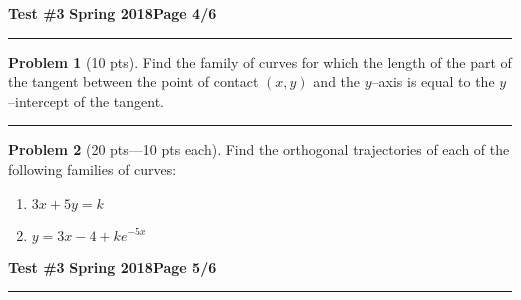 \documentclass[12pt]{article}
\theoremstyle{definition}
\newtheorem{problem}{Problem}
\begin{document}
\newpage

\hfill{\large\bf Test \#3}\hfill{\large\bf
  Spring 2018}\hfill{\large\bf Page 4/6}\hrule

\bigskip
\begin{problem}[10 pts]
Find the family of curves for which the length of the part of the tangent between the point of contact $(x,y)$ and the $y$--axis is equal to the $y$--intercept of the tangent.
\vspace{4cm}
\begin{flushright}
\end{flushright}
\end{problem}
\hrule

\begin{problem}[20 pts---10 pts each]
Find the orthogonal trajectories of each of the following families of curves:
\begin{enumerate}
  \item $3x+5y = k$
  \vspace{3.5cm}
  \begin{flushright}
  \end{flushright}
  \item $y = 3x- 4 + ke^{-5x}$
  \vspace{3.5cm}
  \begin{flushright}
  \end{flushright}
\end{enumerate}
\end{problem}

\newpage

\hfill{\large\bf Test \#3}\hfill{\large\bf
  Spring 2018}\hfill{\large\bf Page 5/6}\hrule
\end{document}
